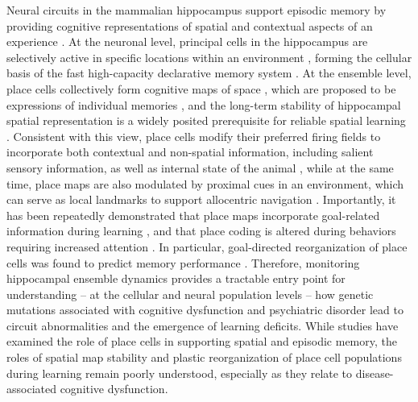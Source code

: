 Neural circuits in the mammalian hippocampus support episodic memory by providing cognitive representations of spatial and contextual aspects of an experience \citep{Burgess2002, Buzsaki2013, Eichenbaum2000, O'Keefe1971}. At the neuronal level, principal cells in the hippocampus are selectively active in specific locations within an environment \citep[place~cells:][]{O'Keefe1971}, forming the cellular basis of the fast high-capacity declarative memory system \citep{Buzsaki2013}. At the ensemble level, place cells collectively form cognitive maps of space \citep{Hartley2014, Leutgeb2005c, O'Keefe1971, OKeefe1978, Moser2015}, which are proposed to be expressions of individual memories \citep{Moser2015, Buzsaki2013}, and the long-term stability of hippocampal spatial representation is a widely posited prerequisite for reliable spatial learning \citep{Kentros2004, Lever2002b, Mankin2012, Thompson1990, Ziv2013}. Consistent with this view, place cells modify their preferred firing fields to incorporate both contextual \citep{Colgin2008, Karlsson2008, Leutgeb2005a, Leutgeb2004, Muller1987b, Wilson1994} and non-spatial information, including salient sensory information, as well as internal state of the animal \citep{Frank2000, Kobayashi1997, Moita2004, Pastalkova2008, Wood1999}, while at the same time, place maps are also modulated by proximal cues in an environment, which can serve as local landmarks to support allocentric navigation \citep{Deshmukh2013, Knierim2011, Knierim2003}. Importantly, it has been repeatedly demonstrated that place maps incorporate goal-related information during learning \citep{Breese1989, Fyhn2002, Dupret2010a, Gothard1996, Hok2007, Hollup2001b, Kobayashi1997}, and that place coding is altered during behaviors requiring increased attention \citep{Kentros2004, Markus1995, Muzzio2009a}. In particular, goal-directed reorganization of place cells was found to predict  memory  performance \citep{Dupret2010a}. Therefore, monitoring hippocampal ensemble dynamics provides a tractable entry point for understanding -- at the cellular and neural population levels -- how genetic mutations associated with cognitive dysfunction and psychiatric disorder lead to circuit abnormalities and the emergence of learning deficits.  While studies have examined the role of place cells in supporting spatial and episodic memory, the roles of spatial map stability and plastic reorganization of place cell populations during learning remain poorly understood, especially as they relate to disease-associated cognitive dysfunction. 

